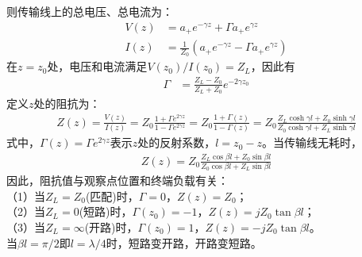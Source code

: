 \documentclass{article}
\numberwithin{equation}{section}
\begin{document}
则传输线上的总电压、总电流为：
\begin{align}
    \label{eq:eq298}
    V(z)&=a_+e^{-\gamma z}+\Gamma a_+e^{\gamma z} \\
    \label{eq:eq299}
    I(z)&=\frac{1}{Z_0}(a_+e^{-\gamma z}-\Gamma a_+e^{\gamma z})
\end{align}
在$z=z_0$处，电压和电流满足$V(z_0)/I(z_0)=Z_L$，因此有
\begin{align}
    \label{eq:eq300}
    \Gamma&=\frac{Z_{L}-Z_{0}}{Z_{L}+Z_{0}}e^{-2\gamma z_0}
\end{align}
定义$z$处的阻抗为：
\begin{align}
    \label{eq:eq301}
    Z(z)=\frac{V(z)}{I(z)}=Z_0\frac{1+\Gamma e^{2\gamma z}}{1-\Gamma e^{2\gamma z}}=Z_0\frac{1+\Gamma(z)}{1-\Gamma(z)}=Z_0\frac{Z_L\cosh\gamma l+Z_0\sinh\gamma l}{Z_0\cosh\gamma l+Z_L\sinh\gamma l}
\end{align}
式中，$\Gamma(z)=\Gamma e^{2\gamma z}$表示$z$处的反射系数，$l=z_0-z$。当传输线无耗时，
\begin{align}
    \label{eq:eq302}
    Z(z)=Z_0\frac{Z_L\cos\beta l+Z_0\sin\beta l}{Z_0\cos\beta l+Z_L\sin\beta l}
\end{align}
因此，阻抗值与观察点位置和终端负载有关：\\
（1）当$Z_L=Z_0$(匹配)时，$\Gamma=0$，$Z(z)=Z_0$； \\
（2）当$Z_L=0$(短路)时，$\Gamma(z_0)=-1$，$Z(z)=jZ_0\tan\beta l$； \\
（3）当$Z_L=\infty$(开路)时，$\Gamma(z_0)=1$，$Z(z)=-jZ_0\tan\beta l$。 \\
当$\beta l=\pi/2$即$l=\lambda/4$时，短路变开路，开路变短路。
\end{document}
